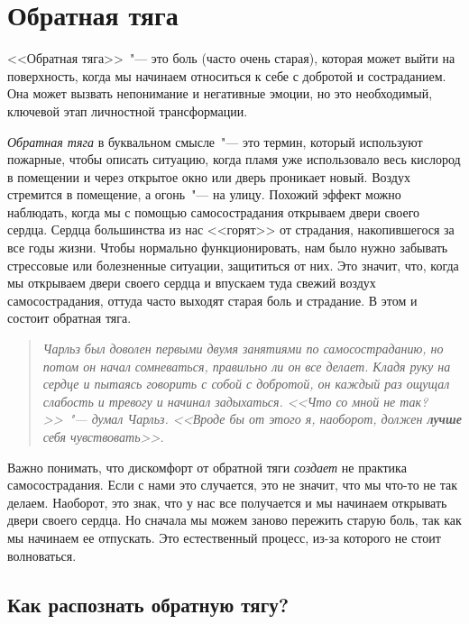 
\chapter{Обратная тяга}\label{Backdraft}

<<Обратная тяга>>~"--- это боль (часто очень старая), которая может выйти на поверхность, когда мы начинаем относиться к себе с добротой и состраданием. Она может вызвать непонимание и негативные эмоции, но это необходимый, ключевой этап личностной трансформации.

\emph{Обратная тяга} в буквальном смысле~"--- это термин, который используют пожарные, чтобы описать ситуацию, когда пламя уже использовало весь кислород в помещении и через открытое окно или дверь проникает новый. Воздух стремится в помещение, а огонь~"--- на улицу.  Похожий эффект можно наблюдать, когда мы с помощью самосострадания открываем двери своего сердца. Сердца большинства из нас <<горят>> от страдания, накопившегося за все годы жизни. Чтобы нормально функционировать, нам было нужно забывать стрессовые или болезненные ситуации, защититься от них. Это значит, что, когда мы открываем двери своего сердца и впускаем туда свежий воздух самосострадания, оттуда часто выходят старая боль и страдание. В этом и состоит обратная тяга.

\begin{quotation}
	\textit{Чарльз был доволен первыми двумя занятиями по самосостраданию, но потом он начал сомневаться, правильно ли он все делает. Кладя руку на сердце и пытаясь говорить с собой с добротой, он каждый раз ощущал слабость и тревогу и начинал задыхаться. <<Что со мной не так?>>~"--- думал Чарльз. <<Вроде бы от этого я, наоборот, должен \textbf{лучше} себя чувствовать>>.}
\end{quotation}

Важно понимать, что дискомфорт от обратной тяги \emph{создает} не практика самосострадания. Если с нами это случается, это не значит, что мы что-то не так делаем. Наоборот, это знак, что у нас все получается и мы начинаем открывать двери своего сердца. Но сначала мы можем заново пережить старую боль, так как мы начинаем ее отпускать\cite{63}. Это естественный процесс, из-за которого не стоит волноваться.  

\section*{Как распознать обратную тягу?} \label{How_Do_We_Recognize_Backdraft?}


